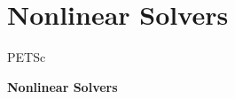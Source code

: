 



















%
%
\section{Nonlinear Solvers}
\begin{frame}{PETSc}
   \begin{center} \Large \textbf{Nonlinear Solvers} \end{center}
\end{frame}


